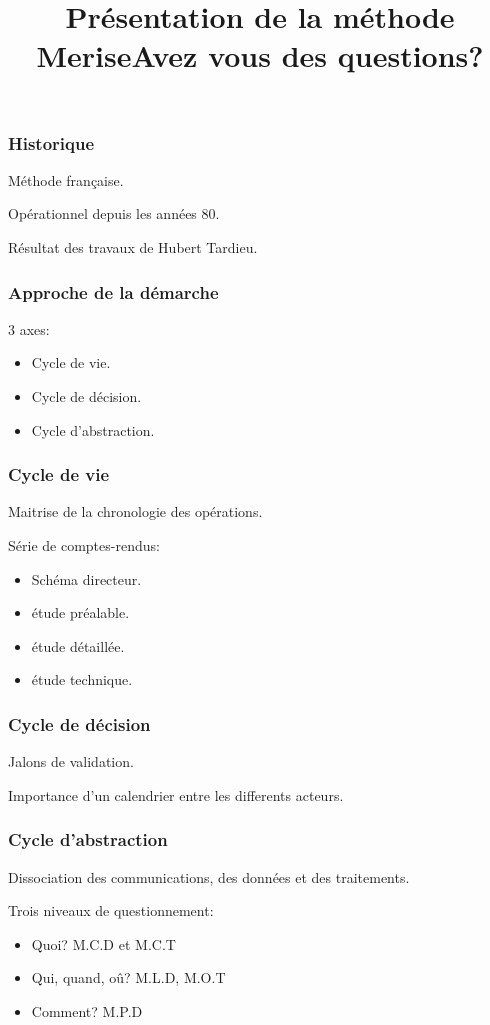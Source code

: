 \documentclass{beamer}
\title{Présentation de la méthode Merise}
\institute{Ynov Bordeaux}
\begin{document}
\begin{frame}
\titlepage
\end{frame}


\begin{frame}
\frametitle{Historique}
Méthode française.

Opérationnel depuis les années 80.

Résultat des travaux de Hubert Tardieu.
\end{frame}

\begin{frame}
\frametitle{Approche de la démarche}
3 axes:
\begin{itemize}
    \item Cycle de vie.
    \item Cycle de décision.
    \item Cycle d'abstraction.
\end{itemize}
\end{frame}
\begin{frame}
\frametitle{Cycle de vie}

Maitrise de la chronologie des opérations.

Série de comptes-rendus:

\begin{itemize}
    \item Schéma directeur.
    \item étude préalable.
    \item étude détaillée.
    \item étude technique.
\end{itemize}
\end{frame}

\begin{frame}
\frametitle{Cycle de décision}
Jalons de validation.

Importance d'un calendrier entre les differents acteurs.
\end{frame}

\begin{frame}
\frametitle{Cycle d'abstraction}
Dissociation des communications, des données et des traitements.

Trois niveaux de questionnement:
\begin{itemize}
    \item Quoi? M.C.D et M.C.T
    \item Qui, quand, oû? M.L.D, M.O.T
    \item Comment? M.P.D
\end{itemize}

\end{frame}
\begin{frame}
\title{Avez vous des questions?}
\titlepage
\end{frame}
\end{document}
